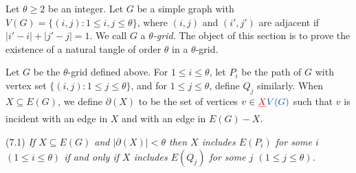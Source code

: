 Let $\theta \ge 2$ be an integer. Let $G$ be a simple graph with $V(G) = \{(i, j) : 1 \le i, j \le \theta\}$, where $(i, j)$ and $(i', j')$ are adjacent if $|i' - i| + |j' - j| = 1$. We call $G$ a \textit{$\theta$-grid}. The object of this section is to prove the existence of a natural tangle of order $\theta$ in a $\theta$-grid.

Let $G$ be the $\theta$-grid defined above. For $1 \le i \le \theta$, let $P_i$ be the path of $G$ with vertex set $\{(i, j) : 1 \le j \le \theta\}$, and for $1 \le j \le \theta$, define $Q_j$ similarly. When $X \subseteq E(G)$, we define $\partial(X)$ to be the set of vertices $v \in \del{X}\fix{V(G)}$ such that $v$ is incident with an edge in $X$ and with an edge in $E(G) - X$.

\stmt
(7.1) \textit{If $X \subseteq E(G)$ and $|\partial(X)| < \theta$ then $X$ includes $E(P_i)$ for some $i$ $(1 \le i \le \theta)$ if and only if $X$ includes $E(Q_j)$ for some $j$ $(1 \le j \le \theta)$.}
